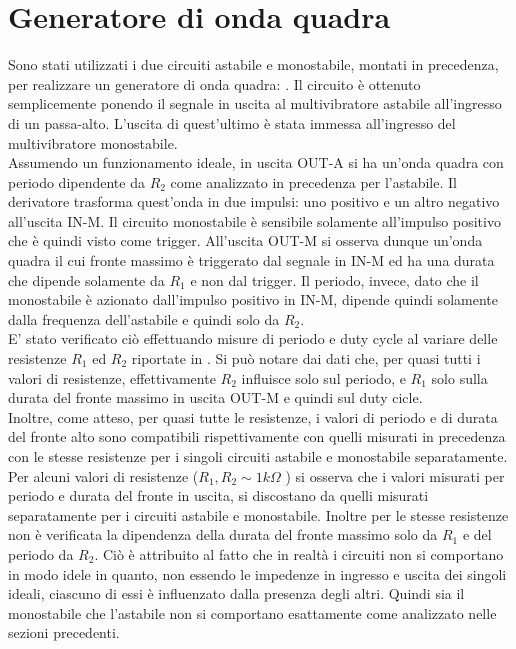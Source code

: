 \section{Generatore di onda quadra}
Sono stati utilizzati i due circuiti astabile e monostabile, montati in precedenza, per realizzare un generatore di onda quadra: . Il circuito è ottenuto semplicemente ponendo il segnale in uscita al multivibratore astabile all'ingresso di un passa-alto. L'uscita di quest'ultimo è stata immessa all'ingresso del multivibratore monostabile. \\
Assumendo un funzionamento ideale, in uscita OUT-A si ha un'onda quadra con periodo dipendente da $R_{2}$ come analizzato in precedenza per l'astabile. Il derivatore trasforma quest'onda in due impulsi: uno positivo e un altro negativo all'uscita IN-M. Il circuito monostabile è sensibile solamente all'impulso positivo che è quindi visto come trigger.
 All'uscita OUT-M si osserva dunque un'onda quadra il cui fronte massimo è triggerato dal segnale in IN-M ed ha una durata che dipende solamente da $R_{1}$ e non dal trigger. Il periodo, invece, dato che il monostabile è azionato dall'impulso positivo in IN-M, dipende quindi solamente dalla frequenza dell'astabile e quindi solo da $R_{2}$.\\
 E' stato verificato ciò effettuando misure di periodo e duty cycle al variare delle resistenze $R_{1}$ ed $R_{2}$ riportate in . Si può notare dai dati che, per quasi tutti i valori di resistenze, effettivamente $R_{2}$ influisce solo sul periodo, e $R_{1}$ solo sulla durata del fronte massimo in uscita OUT-M e quindi sul duty cicle. \\
 Inoltre, come atteso, per quasi tutte le resistenze, i valori di periodo e di durata del fronte alto sono compatibili rispettivamente con quelli misurati in precedenza con le stesse resistenze per i singoli circuiti astabile e monostabile separatamente.\\
 Per alcuni valori di resistenze ($R_{1},R_{2}\sim 1 k\Omega $ ) si osserva che i valori misurati per periodo e durata del fronte in uscita, si discostano da quelli misurati separatamente per i circuiti astabile e monostabile. Inoltre per le stesse resistenze non è verificata la dipendenza della durata del fronte massimo solo da $R_1 $ e del periodo da $R_2$. Ciò è attribuito al fatto che in realtà i circuiti non si comportano in modo idele in quanto, non essendo le impedenze in ingresso e uscita dei singoli ideali,  ciascuno di essi è influenzato dalla presenza degli altri. Quindi sia il monostabile che l'astabile non si comportano esattamente come analizzato nelle sezioni precedenti.\\
